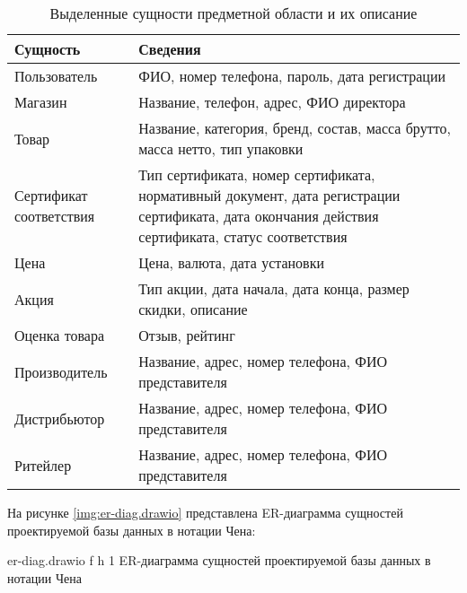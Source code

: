 \begin{table}[ht]
	\begin{center}
		\begin{threeparttable}
			\caption{Выделенные сущности предметной области и их описание}
			\label{tbl:db_entities}
			\begin{tabular}{|p{4.5cm}|p{10cm}|}
				\hline
				\textbf{Сущность} & \textbf{Сведения} \\ \hline
				Пользователь & ФИО, номер телефона, пароль, дата регистрации \\ 
				\hline
				Магазин & Название, телефон, адрес, ФИО директора \\ 
				\hline
				Товар & Название, категория, бренд, состав, масса брутто, масса нетто, тип упаковки \\ 
				\hline
				Сертификат соответствия & Тип сертификата, номер сертификата, нормативный документ, дата регистрации сертификата, дата окончания действия сертификата, статус соответствия \\ 
				\hline
				Цена & Цена, валюта, дата установки  \\ 
				\hline
				Акция & Тип акции, дата начала, дата конца, размер скидки, описание \\ 
				\hline
				Оценка товара & Отзыв, рейтинг \\ 
				\hline
				Производитель & Название, адрес, номер телефона, ФИО представителя \\ 
				\hline
				Дистрибьютор & Название, адрес, номер телефона, ФИО представителя \\ 
				\hline
				Ритейлер & Название, адрес, номер телефона, ФИО представителя \\ 
				\hline
			\end{tabular}
		\end{threeparttable}
	\end{center}
\end{table}

\clearpage

На рисунке \ref{img:er-diag.drawio} представлена ER-диаграмма сущностей проектируемой базы данных в нотации Чена:

{er-diag.drawio} %
{f} %
{h} %
{1\textwidth} %
{ER-диаграмма сущностей проектируемой базы данных в нотации Чена} %

\clearpage

